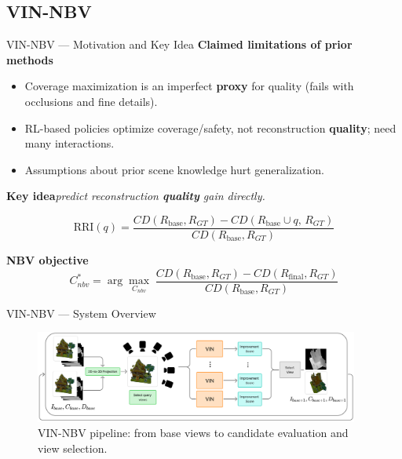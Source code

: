 \documentclass[10pt,aspectratio=169]{beamer}
\begin{document}
\subsection{VIN-NBV}
\begin{frame}{VIN-NBV --- Motivation and Key Idea}
\textbf{Claimed limitations of prior methods}~\cite{VIN-NBV-frahm2025}
\begin{itemize}
  \item Coverage maximization is an imperfect \textbf{proxy} for quality (fails with occlusions and fine details).
  \item RL-based policies optimize coverage/safety, not reconstruction \textbf{quality}; need many interactions.
  \item Assumptions about prior scene knowledge hurt generalization.
\end{itemize}

\vspace{1em}
\textbf{Key idea}\;\textemdash\;\emph{predict reconstruction \textbf{quality} gain directly.}

\begin{equation*}
\mathrm{RRI}(q)=\frac{CD(R_{\text{base}},R_{GT})-CD(R_{\text{base}}\cup q,\,R_{GT})}{CD(R_{\text{base}},R_{GT})}
\end{equation*}

\vspace{0.5em}
\textbf{NBV objective}
\begin{equation*}
C^{*}_{nbv}=\arg\max_{C_{nbv}} \; \frac{CD(R_{\text{base}},R_{GT})-CD(R_{\text{final}},R_{GT})}{CD(R_{\text{base}},R_{GT})}
\end{equation*}
\end{frame}

\begin{frame}{VIN-NBV --- System Overview}
\begin{figure}
  \centering
  \includegraphics[width=0.95\textwidth]{../../literature/tex-src/VIN-NBV/Figures/VIN-NBV_diagram.png}
  \caption{VIN-NBV pipeline: from base views to candidate evaluation and view selection.}
\end{figure}
\end{frame}
\end{document}
